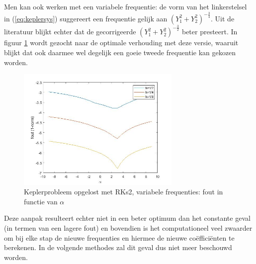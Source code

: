 \documentclass[12pt]{article}
\begin{document}
Men kan ook werken met een variabele frequentie: de vorm van het linkerstelsel in (\ref{eq:keplersys}) suggereert een frequentie gelijk aan \((Y_1^2+Y_2^2)^{-\frac{3}{4}}\). Uit de literatuur blijkt echter dat de gecorrigeerde \((Y_1^2+Y_2^2)^{-\frac{3}{2}}\) beter presteert. In figuur \ref{fig:varkepleralphasrks2} wordt gezocht naar de optimale verhouding met deze versie, waaruit blijkt dat ook daarmee wel degelijk een goeie tweede frequentie kan gekozen worden.
\begin{figure}[H]
    \centering
    \includegraphics[width=0.7\textwidth]{kepler_RKs2_var.jpg}
    \caption{Keplerprobleem opgelost met RKs2, variabele frequenties: fout in functie van \(\alpha\)}
    \label{fig:varkepleralphasrks2}
\end{figure}
Deze aanpak resulteert echter niet in een beter optimum dan het constante geval (in termen van een lagere fout) en bovendien is het computationeel veel zwaarder om bij elke stap de nieuwe frequenties en hiermee de nieuwe coëfficiënten te berekenen. In de volgende methodes zal dit geval dus niet meer beschouwd worden.
\end{document}
